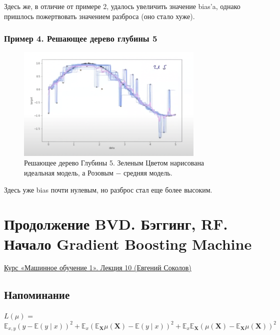             Здесь же, в отличие от примере 2, удалось увеличить значение bias'a, однако пришлось пожертвовать значением разброса (оно стало хуже). 


        \subsubsection{Пример 4. Решающее дерево глубины 5}

            \begin{figure}[H]
                \centering
                \includegraphics[width=0.8\textwidth]{images/9lecture/ex4.png}
                \caption{Решающее дерево Глубины 5. Зеленым Цветом нарисована идеальная модель, а Розовым $-$ средняя модель.}
            \end{figure}

            Здесь уже bias почти нулевым, но разброс стал еще более высоким.


\newpage
\section{Продолжение BVD. Бэггинг, RF. Начало Gradient Boosting Machine}

    \href{https://www.youtube.com/watch?v=LU5FlFYLHo0&list=PLEqoHzpnmTfChItexxg2ZfxCsm-8QPsdS&index=12}{Курс «Машинное обучение 1». Лекция 10 (Евгений Соколов)}
    \subsection{Напоминание}
        \begin{center}
            \Large
            $L(\mu)$ = $\mathbb{E}_{x, y}(y - \mathbb{E}(y \mid x))^2 + \mathbb{E}_x(\mathbb{E}_{\mathbf{X}}\mu(\mathbf{X}) - \mathbb{E}(y \mid x))^2 + \mathbb{E}_x\mathbb{E}_\mathbf{X}( \mu(\mathbf{X}) - \mathbb{E}_\mathbf{X}\mu(\mathbf{X}) )^2$
        \end{center}

